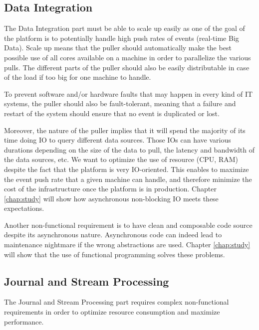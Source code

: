 \subsection{Data Integration}

The Data Integration part must be able to scale up easily as one of the goal of the platform is to potentially handle high push rates of events (real-time Big Data). Scale up means that the puller should automatically make the best possible use of all cores available on a machine in order to parallelize the various pulls. The different parts of the puller should also be easily distributable in case of the load if too big for one machine to handle. 

To prevent software and/or hardware faults that may happen in every kind of IT systems, the puller should also be fault-tolerant, meaning that a failure and restart of the system should ensure that no event is duplicated or lost.

Moreover, the nature of the puller implies that it will spend the majority of its time doing IO to query different data sources.
Those IOs can have various durations depending on the size of the data to pull, the latency and bandwidth of the data sources, etc.
We want to optimize the use of resource (CPU, RAM) despite the fact that the platform is very IO-oriented. This enables to maximize the event push rate that a given machine can handle, and therefore minimize the cost of the infrastructure once the platform is in production. Chapter \ref{chap:study} will show how asynchronous non-blocking IO meets these expectations. 

Another non-functional requirement is to have clean and composable code source despite its asynchronous nature. Asynchronous
code can indeed lead to maintenance nightmare if the wrong abstractions are used. Chapter \ref{chap:study} will
show that the use of functional programming solves these problems.

\subsection{Journal and Stream Processing}

The Journal and Stream Processing part requires complex non-functional requirements in order to optimize resource consumption and maximize performance.

